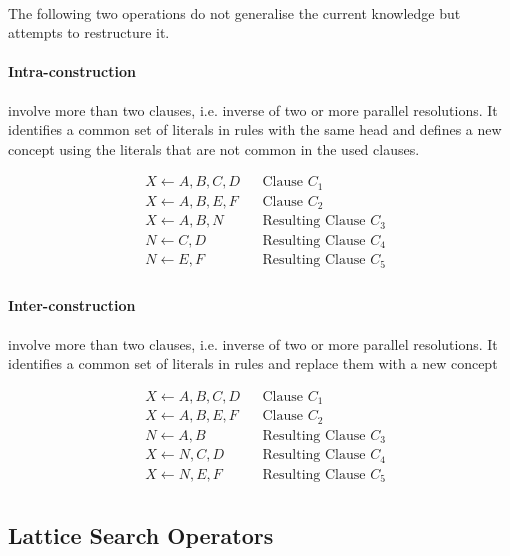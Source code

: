 \documentclass{article}
\theoremstyle{plain}
\theoremstyle{definition}
\begin{document}
\begin{multicols}{2}
\paragraph{} The following two operations do not generalise the current knowledge but attempts to restructure it.

\paragraph{Intra-construction} involve more than two clauses, i.e. inverse of two or more parallel resolutions. It identifies a common set of literals in rules with the same head and defines a new concept using the literals that are not common in the used clauses.

\begin{align*}
& X \leftarrow A, B, C, D && \text{Clause } C_1\\
& X \leftarrow A, B, E, F && \text{Clause } C_2\\
& X \leftarrow A, B, N && \text{Resulting Clause } C_3\\
& N \leftarrow C, D && \text{Resulting Clause } C_4\\
& N \leftarrow E, F && \text{Resulting Clause } C_5\\
\end{align*}

\paragraph{Inter-construction} involve more than two clauses, i.e. inverse of two or more parallel resolutions. It identifies a common set of literals in rules and replace them with a new concept

\begin{align*}
& X \leftarrow A, B, C, D && \text{Clause } C_1\\
& X \leftarrow A, B, E, F && \text{Clause } C_2\\
& N \leftarrow A, B && \text{Resulting Clause } C_3\\
& X \leftarrow N, C, D && \text{Resulting Clause } C_4\\
& X \leftarrow N, E, F && \text{Resulting Clause } C_5\\
\end{align*}

\subsection{Lattice Search Operators}\label{sec:LearningAsASearch}


\end{multicols}
\end{document}
